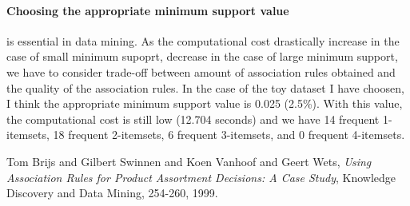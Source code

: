 \documentclass[a4paper,11pt]{article}
\begin{document}
\paragraph{Choosing the appropriate minimum support value} is essential in data mining. As the computational cost drastically increase in the case of small minimum supoprt, decrease in the case of large minimum support, we have to consider trade-off between amount of association rules obtained and the quality of the association rules. In the case of the toy dataset I have choosen, I think the appropriate minimum support value is 0.025 (2.5\%). With this value, the computational cost is
still low (12.704 seconds) and we have 14 frequent 1-itemsets, 18 frequent 2-itemsets, 6 frequent 3-itemsets, and 0 frequent 4-itemsets. 

\begin{thebibliography}{9}
        Tom Brijs and Gilbert Swinnen and Koen Vanhoof and Geert Wets,
        \emph{Using Association Rules for Product Assortment Decisions: A Case Study},
        Knowledge Discovery and Data Mining, 254-260, 1999.
\end{thebibliography}
\end{document}
